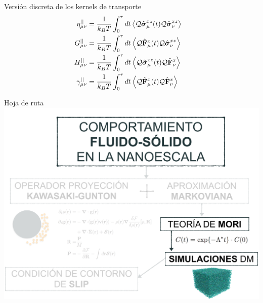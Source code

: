\documentclass{beamer}
\begin{document}
\begin{frame}{Versión discreta de los kernels de transporte}
\begin{align}
\eta^{||}_{\mu\nu}&
=\frac{1}{k_BT}\int_0^\tau  dt\left\langle 
{\cal Q}\hat{\boldsymbol{\sigma}}^{xz}_\mu(t){\cal Q}\hat{\boldsymbol{\sigma}}^{xz}_\nu
\right\rangle&&
\nonumber\\
G^{||}_{\mu\nu}&
=\frac{1}{k_BT} \int_0^\tau  dt
\left\langle{\cal Q}\hat{\bf F}^{x}_\mu(t)
{\cal Q}\hat{\boldsymbol{\sigma}}^{xz}_\nu
\right\rangle&&
\nonumber\\
H^{||}_{\mu\nu}&
=\frac{1}{k_BT} 
\int_0^\tau  dt
\left\langle{\cal Q}\hat{\boldsymbol{\sigma}}^{xz}_\mu(t){\cal Q}\hat{\bf F}^{x}_\nu\right\rangle&&
\nonumber\\
\gamma^{||}_{\mu\nu}&=
\frac{1}{k_BT} \int_0^\tau  dt
\left\langle 
{\cal Q}\hat{\bf F}^{x}_\mu(t)
{\cal Q}\hat{\bf F}^{x}_\nu\right\rangle&&
\nonumber
\end{align}
\end{frame}

\begin{frame}{Hoja de ruta}
  \includegraphics[width=\linewidth]{scheme-thesis-mori}
\end{frame}
\end{document}
